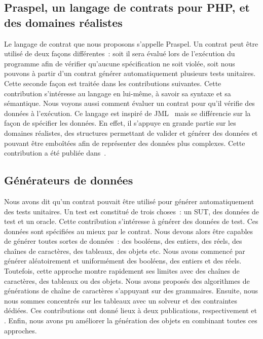 \subsection{Praspel, un langage de contrats pour PHP, et des domaines réalistes}

Le langage de contrat que nous proposons s'appelle {\strong Praspel}. Un contrat
peut être utilisé de deux façons différentes~: soit il sera évalué lors de
l'exécution du programme afin de vérifier qu'aucune spécification ne soit
violée, soit nous pouvons à partir d'un contrat générer automatiquement
plusieurs tests unitaires. Cette seconde façon est traitée dans les
contributions suivantes.  Cette contribution s'intéresse au langage en lui-même,
à savoir sa syntaxe et sa sémantique. Nous voyons aussi comment évaluer un
contrat pour qu'il vérifie des données à l'exécution. Ce langage est inspiré de
JML~ mais se différencie sur la façon de spécifier les données. En
effet, il s'appuye en grande partie sur les {\strong domaines réalistes}, des
structures permettant de valider et générer des données et pouvant être
emboîtées afin de représenter des données plus complexes. Cette contribution a
été publiée dans~.

\subsection{Générateurs de données}

Nous avons dit qu'un contrat pouvait être utilisé pour générer automatiquement
des tests unitaires. Un test est constitué de trois choses~: un SUT, des données
de test et un oracle. Cette contribution s'intéresse à générer des données de
test. Ces données sont spécifiées au mieux par le contrat. Nous devons alors
être capables de générer toutes sortes de données~: des booléens, des entiers,
des réels, des chaînes de caractères, des tableaux, des objets etc. Nous avons
commencé par générer aléatoirement et uniformément des booléens, des entiers et
des réels. Toutefois, cette approche montre rapidement ses limites avec des
chaînes de caractères, des tableaux ou des objets. Nous avons proposés des
algorithmes de générations de chaîne de caractères s'appuyant sur des
grammaires. Ensuite, nous nous sommes concentrés sur les tableaux avec un
solveur et des contraintes dédiées. Ces contributions ont donné lieux à deux
publications, respectivement  et .
Enfin, nous avons pu améliorer la génération des objets en combinant toutes ces
approches.

